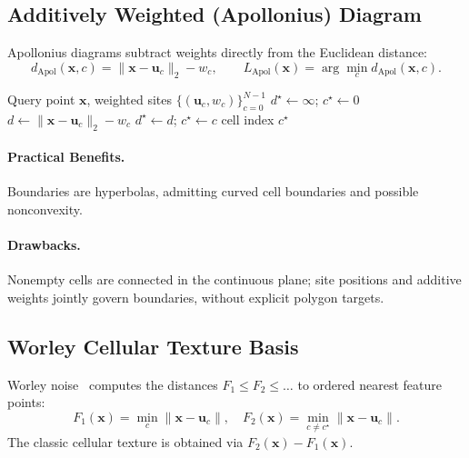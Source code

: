 \documentclass[sigconf,nonacm]{acmart}
\begin{document}
\subsection{Additively Weighted (Apollonius) Diagram}

Apollonius diagrams subtract weights directly from the Euclidean distance:
\begin{equation}
d_{\text{Apol}}(\mathbf{x}, c) = \lVert \mathbf{x} - \mathbf{u}_c \rVert_2 - w_c,
\qquad
L_{\text{Apol}}(\mathbf{x}) = \arg\min_c d_{\text{Apol}}(\mathbf{x}, c).
\end{equation}

\begin{algorithm}[H]
\caption{Apollonius Diagram Generator}
\begin{algorithmic}[1]
\Require Query point $\mathbf{x}$, weighted sites $\{(\mathbf{u}_c, w_c)\}_{c=0}^{N-1}$
\State $d^\star \gets \infty$;\; $c^\star \gets 0$
  \State $d \gets \lVert \mathbf{x} - \mathbf{u}_c \rVert_2 - w_c$
    \State $d^\star \gets d$;\; $c^\star \gets c$
  \EndIf
\EndFor
\State \Return cell index $c^\star$
\end{algorithmic}
\end{algorithm}

\paragraph{Practical Benefits.} Boundaries are hyperbolas, admitting curved
cell boundaries and possible nonconvexity.
\paragraph{Drawbacks.} Nonempty cells are connected in the continuous plane;
site positions and additive weights jointly govern boundaries, without explicit
polygon targets.

\subsection{Worley Cellular Texture Basis}

Worley noise~\cite{worley1996} computes the distances $F_1 \le F_2 \le \dots$ to
ordered nearest feature points:
\begin{equation}
F_1(\mathbf{x}) = \min_c \lVert \mathbf{x} - \mathbf{u}_c \rVert,
\quad
F_2(\mathbf{x}) = \min_{c \ne c^\star} \lVert \mathbf{x} - \mathbf{u}_c \rVert.
\end{equation}
The classic cellular texture is obtained via $F_2(\mathbf{x}) - F_1(\mathbf{x})$.
\end{document}
